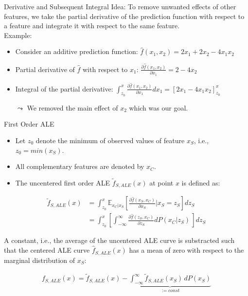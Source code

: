 \documentclass[aspectratio=169]{../latex_main/tntbeamer}  %
\begin{document}
\begin{frame}{Derivative and Subsequent Integral}
\alert{Idea:} To remove unwanted effects of other features, we take the partial derivative of the prediction function with respect to a feature and integrate it with respect to the same feature. \\
\smallskip\pause
Example:
\begin{itemize}
\item Consider an additive prediction function: $\hat{f}(x_1, x_2) = 2x_1 + 2x_2 - 4x_1 x_2$
\smallskip\pause
\item Partial derivative of $\hat{f}$ with respect to $x_1$: $\frac{\partial \hat{f}(x_1, x_2)}{\partial x_1} = 2 - 4x_2$
\smallskip\pause
\item Integral of the partial derivative:  $\int_{z_0}^{x} \frac{\partial \hat{f}(x_1, x_2)}{\partial x_1} dx_1 = \left[2x_1 - 4x_1 x_2\right]_{z_0}^{x}$
\smallskip\pause
\item[$\leadsto$] We removed the main effect of $x_2$ which was our goal.
\end{itemize}
\end{frame}


\begin{frame}{First Order ALE}

\vspace{-2em}
\begin{itemize}
    \item Let $z_0$ denote the minimum of observed values of feature $x_S$, i.e., $z_0 = min(x_S)$.
    \item All complementary features are denoted by $x_C$.
    \item The uncentered first order ALE $\tilde{f}_{S, ALE}(x)$ at point $x$ is defined as:
\end{itemize}
  
$$
\begin{aligned}
\tilde{f}_{S, ALE}(x) &= \int_{z_{0}}^{x} \mathbb{E}_{x_C \vert x_S} \left[\frac{\partial \hat{f}(x_S, x_C)}{\partial x_S} \bigg \vert x_S = z_S \right] dz_S \\
&= \int_{z_{0}}^{x} \left[ \int_{-\infty}^{\infty}  \frac{\partial \hat{f}(z_S, x_C)}{\partial z_S} d P(x_C | z_S) \,   \right] dz_S
\end{aligned}
$$

\pause

A constant, i.e., the average of the uncentered ALE curve is substracted such that the centered ALE curve $\hat{f}_{S, ALE}(x)$ has a mean of zero with respect to the marginal distribution of $x_S$:

$$
\begin{aligned}
f_{S, ALE}(x) = \tilde{f}_{S, ALE}(x) - \underbrace{\int_{-\infty}^{\infty}\tilde{f}_{S, ALE}(x_S) \, d P(x_S)}_{:= const}
\end{aligned}
$$

\end{frame}
\end{document}

